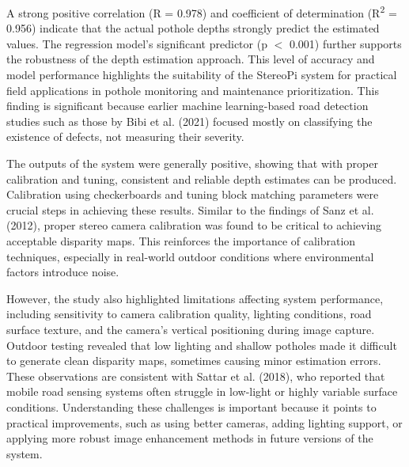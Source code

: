A strong positive correlation (R = 0.978) and coefficient of determination (R\textsuperscript{2} = 0.956) indicate that the actual pothole depths strongly predict the estimated values. The regression model’s significant predictor (p $<$ 0.001) further supports the robustness of the depth estimation approach. This level of accuracy and model performance highlights the suitability of the StereoPi system for practical field applications in pothole monitoring and maintenance prioritization. This finding is significant because earlier machine learning-based road detection studies such as those by Bibi et al. (2021) focused mostly on classifying the existence of defects, not measuring their severity.

The outputs of the system were generally positive, showing that with proper calibration and tuning, consistent and reliable depth estimates can be produced. Calibration using checkerboards and tuning block matching parameters were crucial steps in achieving these results. Similar to the findings of Sanz et al. (2012), proper stereo camera calibration was found to be critical to achieving acceptable disparity maps. This reinforces the importance of calibration techniques, especially in real-world outdoor conditions where environmental factors introduce noise.

However, the study also highlighted limitations affecting system performance, including sensitivity to camera calibration quality, lighting conditions, road surface texture, and the camera's vertical positioning during image capture. Outdoor testing revealed that low lighting and shallow potholes made it difficult to generate clean disparity maps, sometimes causing minor estimation errors. These observations are consistent with Sattar et al. (2018), who reported that mobile road sensing systems often struggle in low-light or highly variable surface conditions. Understanding these challenges is important because it points to practical improvements, such as using better cameras, adding lighting support, or applying more robust image enhancement methods in future versions of the system.
